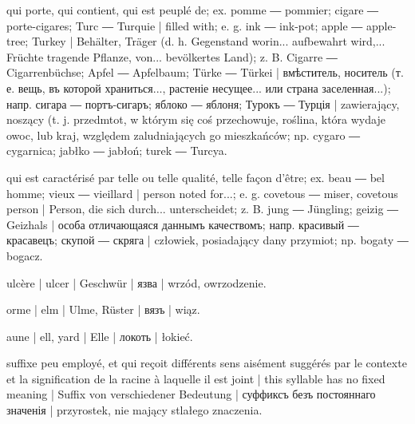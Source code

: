 \begin{outdent}{1em}
qui porte, qui contient, qui est peuplé de; ex.  pomme ―
 pommier;  cigare ―  porte-cigares;
 Turc ―  Turquie | filled with; e. g.  ink ―
 ink-pot;  apple ―  apple-tree; 
Turkey | Behälter, Träger (d. h. Gegenstand worin... aufbewahrt
wird,... Früchte tragende Pflanze, von... bevölkertes Land);
z. B.  Cigarre ―  Cigarrenbüchse;  Apfel
―  Apfelbaum;  Türke ―  Türkei | вмѣститель, носитель (т. е. вещь, въ которой храниться..., растеніе
несущее... или страна заселенная...); напр.  сигара ―
 портъ-сигаръ;  яблоко ―  яблоня; 
Турокъ ―  Турція | zawierający, noszący (t. j. przedmtot,
w którym się coś przechowuje, roślina, która wydaje owoc, lub kraj,
względem zaludniających go mieszkańców; np.  cygaro ―
 cygarnica;  jabłko ―  jabłoń; 
turek ―  Turcya.

qui est caractérisé par telle ou telle qualité, telle façon
d’être; ex.  beau ―  bel homme;  vieux ―
 vieillard | person noted for...; e. g.  covetous
―  miser, covetous person | Person, die sich
durch... unterscheidet; z. B.  jung ―  Jüngling;
 geizig ―  Geizhals | особа отличающаяся даннымъ
качествомъ; напр.  красивый ―  красавецъ; 
скупой ―  скряга | człowiek, posiadający dany przymiot;
np.  bogaty ―  bogacz.

ulcère | ulcer | Geschwür | язва | wrzód, owrzodzenie.

orme | elm | Ulme, Rüster | вязъ | wiąz.

aune | ell, yard | Elle | локоть | łokieć.

suffixe peu employé, et qui reçoit différents sens aisément
suggérés par le contexte et la signification de la racine à laquelle
il est joint | this syllable has no fixed meaning | Suffix von
verschiedener Bedeutung | суффиксъ безъ постояннаго значенія | przyrostek, nie mający stlałego znaczenia.


\end{outdent}
